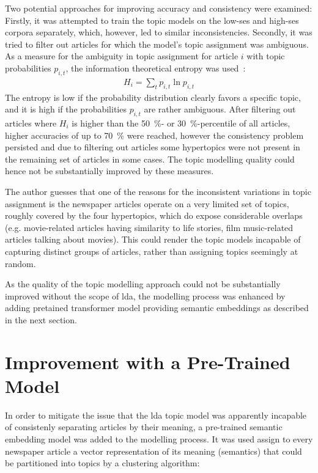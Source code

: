 Two potential approaches for improving accuracy and consistency were examined: Firstly, it was attempted to train the topic models on the low-\gls{ses} and high-\gls{ses} corpora separately, which, however, led to similar inconsistencies. Secondly, it was tried to filter out articles for which the model's topic assignment was ambiguous. As a measure for the ambiguity in topic assignment for article $i$ with topic probabilities $p_{i, t}$, the information theoretical entropy was used~\autocite{gray_entropy_2013}:
\begin{align}
    H_i = \sum_t p_{i, t} \ln p_{i,t}
\end{align}
The entropy is low if the probability distribution clearly favors a specific topic, and it is high if the probabilities $p_{i, t}$ are rather ambiguous. After filtering out articles where $H_i$ is higher than the \SI{50}{\percent}- or \SI{30}{\percent}-percentile of all articles, higher accuracies of up to \SI{70}{\percent} were reached, however the consistency problem persisted and due to filtering out articles some hypertopics were not present in the remaining set of articles in some cases. The topic modelling quality could hence not be substantially improved by these measures.

The author guesses that one of the reasons for the inconsistent variations in topic assignment is the newspaper articles operate on a very limited set of topics, roughly covered by the four hypertopics, which do expose considerable overlaps (e.g. movie-related articles having similarity to life stories, film music-related articles talking about movies). This could render the topic models incapable of capturing distinct groups of articles, rather than assigning topics seemingly at random.

As the quality of the topic modelling approach could not be substantially improved without the scope of \gls{lda}, the modelling process was enhanced by adding pretained transformer model providing semantic embeddings as described in the next section.

\section{Improvement with a Pre-Trained Model}
In order to mitigate the issue that the \gls{lda} topic model was apparently incapable of consistenly separating articles by their meaning, a pre-trained semantic embedding model was added to the modelling process. It was used assign to every newspaper article a vector representation of its meaning (semantics) that could be partitioned into topics by a clustering algorithm:


